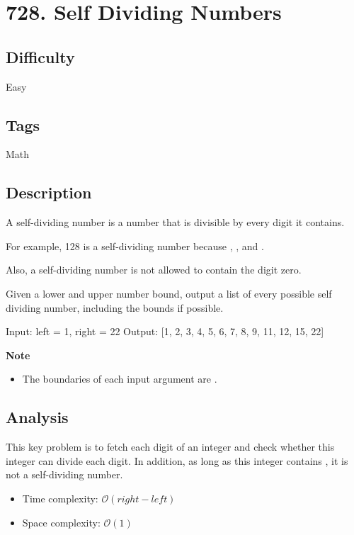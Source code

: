 \tocless\section{728. Self Dividing Numbers}
\label{algo:728}

\subsection*{Difficulty}
Easy

\subsection*{Tags}
Math

\subsection*{Description}
A self-dividing number is a number that is divisible by every digit it contains.

For example, 128 is a self-dividing number because , , and .

Also, a self-dividing number is not allowed to contain the digit zero.

Given a lower and upper number bound, output a list of every possible self dividing number, including the bounds if possible.

\begin{example}
\begin{multilinecode}
Input: left = 1, right = 22
Output: [1, 2, 3, 4, 5, 6, 7, 8, 9, 11, 12, 15, 22]
\end{multilinecode}
\end{example}

\textbf{Note}
\begin{itemize}
    \item The boundaries of each input argument are .
\end{itemize}

\subsection*{Analysis}
This key problem is to fetch each digit of an integer and check whether this integer can divide each digit. In addition, as long as this integer contains , it is not a self-dividing number.

\begin{itemize}
    \item Time complexity: $\mathcal{O}(right - left)$
    \item Space complexity: $\mathcal{O}(1)$
\end{itemize}

